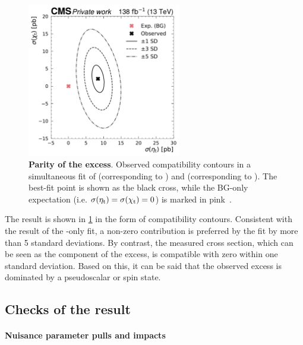 \begin{figure}[th]
    \centering
    \includegraphics[width=0.6\textwidth]{figures/ah/etatfit/A_m365_w2p0__H_m365_w2p0_nll_CMS_EtaT_norm_13TeV__CMS_ChiT_norm_13TeV_ll.pdf}
    \caption{
        \textbf{Parity of the excess}. Observed compatibility contours in a simultaneous fit of \etat (corresponding to ) and \chit (corresponding to ). The best-fit point is shown as the black cross, while the BG-only expectation (i.e. $\sigma(\mathrm{\eta_t})=\sigma(\mathrm{\chi_t})=0$) is marked in pink~\cite{CMS:TOP-24-007}.
    }
    \label{fig:ah:parityscan}
\end{figure}

The result is shown in \cref{fig:ah:parityscan} in the form of compatibility contours. Consistent with the result of the \etat-only fit, a non-zero \etat contribution is preferred by the fit by more than 5 standard deviations. By contrast, the measured \chit cross section, which can be seen as the  component of the excess, is compatible with zero within one standard deviation. Based on this, it can be said that the observed excess is dominated by a pseudoscalar or  spin state.

\subsection{Checks of the result}
\label{sec:ah:checks}

\paragraph{Nuisance parameter pulls and impacts}

